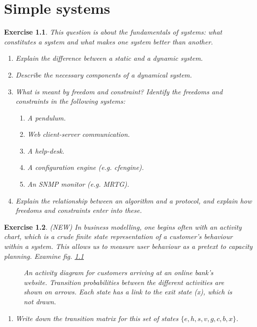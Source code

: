 \documentclass{book}
\newtheorem{exercise}{Exercise}
\begin{document}
\chapter{ Simple systems}



\begin{exercise} 
This question is about the fundamentals of systems: what constitutes a system and what
makes one system better than another.
\begin{enumerate}
\item Explain the difference between a static and a dynamic system.
\item Describe the necessary components of a dynamical system.
\item What is meant by freedom and constraint? Identify the freedoms and constraints
in the following systems:
\begin{enumerate}
\item A pendulum.
\item Web client-server communication.
\item A help-desk.
\item A configuration engine (e.g. cfengine).
\item An SNMP monitor (e.g. MRTG).
\end{enumerate}

\item Explain the relationship between an algorithm and a protocol, and explain
how freedoms and constraints enter into these.

\end{enumerate}
\end{exercise}
\begin{solution}
\end{solution}


\begin{exercise} \label{busopp}
(NEW) In business modelling, one begins often with an activity chart,
which is a crude finite state representation of a customer's behaviour
within a system. This allows us to measure user behaviour as a pretext to
capacity planning. Examine fig. \ref{bus}
\begin{figure}[ht]
\caption{An activity diagram for customers arriving at an online
bank's website. Transition probabilities between the different activities
are shown on arrows. Each state has a link to the exit state (x),
which is not drawn.\label{bus}}
\end{figure}

\begin{enumerate}
\item Write down the transition matrix for this set of states $\{e,h,s,v,g,c,b,x\}$.
\end{enumerate}
\end{exercise}
\begin{solution}
\end{solution}
\end{document}
